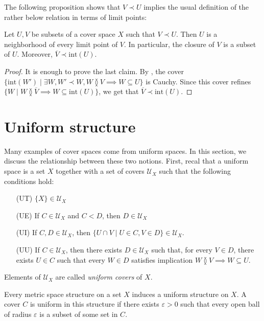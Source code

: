 \documentclass[reqno]{amsart}
\theoremstyle{definition}
\theoremstyle{remark}
\numberwithin{figure}{section}
\newcommand{\overlap}[2]{#1 \between #2}
\newcommand{\refines}{<}
\newcommand{\rb}{\prec}
\begin{document}
The following proposition shows that $V \rb U$ implies the usual definition of the rather below relation in terms of limit points:

\begin{prop}
Let $U,V$ be subsets of a cover space $X$ such that $V \rb U$.
Then $U$ is a neighborhood of every limit point of $V$.
In particular, the closure of $V$ is a subset of $U$.
Moreover, $\overline{V} \rb \mathrm{int}(U)$.
\end{prop}
\begin{proof}
It is enough to prove the last claim.
By , the cover $\{ \mathrm{int}(W') \mid \exists W, W' \rb W, \overlap{W}{V} \implies W \subseteq U \}$ is Cauchy.
Since this cover refines $\{ W \mid \overlap{W}{\overline{V}} \implies W \subseteq \mathrm{int}(U) \}$, we get that $\overline{V} \rb \mathrm{int}(U)$.
\end{proof}

\section{Uniform structure}

Many examples of cover spaces come from uniform spaces.
In this section, we discuss the relationship between these two notions.
First, recal that a uniform space is a set $X$ together with a set of covers $\mathcal{U}_X$ such that the following conditions hold:
\begin{itemize}
\item[(UT)] $\{ X \} \in \mathcal{U}_X$
\item[(UE)] If $C \in \mathcal{U}_X$ and $C \refines D$, then $D \in \mathcal{U}_X$
\item[(UI)] If $C,D \in \mathcal{U}_X$, then $\{ U \cap V \mid U \in C, V \in D \} \in \mathcal{U}_X$.
\item[(UU)] If $C \in \mathcal{U}_X$, then there exists $D \in \mathcal{U}_X$ such that, for every $V \in D$,
there exists $U \in C$ such that every $W \in D$ satisfies implication $\overlap{W}{V} \implies W \subseteq U$.
\end{itemize}
Elements of $\mathcal{U}_X$ are called \emph{uniform covers} of $X$.

\begin{example}
Every metric space structure on a set $X$ induces a uniform structure on $X$.
A cover $C$ is uniform in this structure if there exists $\varepsilon > 0$ such that every open ball of radius $\varepsilon$ is a subset of some set in $C$.
\end{example}
\end{document}
